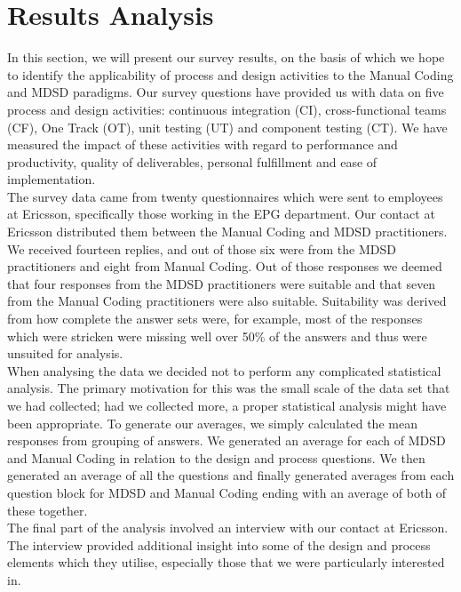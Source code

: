 \documentclass[final_report_innit.tex]{subfiles}
\begin{document}
\section{Results Analysis}

In this section, we will present our survey results, on the basis of which we hope to identify the applicability of process and design activities to the Manual Coding and MDSD paradigms. Our survey questions have provided us with data on five process and design activities: continuous integration (CI), cross-functional teams (CF), One Track (OT), unit testing (UT) and component testing (CT). We have measured the impact of these activities with regard to performance and productivity, quality of deliverables, personal fulfillment and ease of implementation.
\\

The survey data came from twenty questionnaires which were sent to employees at Ericsson, specifically those working in the EPG department. Our contact at Ericsson distributed them between the Manual Coding and MDSD practitioners. We received fourteen replies, and out of those six were from the MDSD practitioners and eight from Manual Coding. Out of those responses we deemed that four responses from the MDSD practitioners were suitable and that seven from the Manual Coding practitioners were also suitable. Suitability was derived from how complete the answer sets were, for example, most of the responses which were stricken were missing well over 50\% of the answers and thus were unsuited for analysis.
\\

When analysing the data we decided not to perform any complicated statistical analysis. The primary motivation for this was the small scale of the data set that we had collected; had we collected more, a proper statistical analysis might have been appropriate. To generate our averages, we simply calculated the mean responses from grouping of answers. We generated an average for each of MDSD and Manual Coding in relation to the design and process questions. We then generated an average of all the questions and finally generated averages from each question block for MDSD and Manual Coding ending with an average of both of these together.
\\

The final part of the analysis involved an interview with our contact at Ericsson. The interview provided additional insight into some of the design and process elements which they utilise, especially those that we were particularly interested in.
\\
\end{document}
